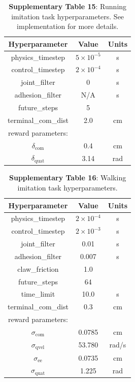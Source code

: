 \documentclass[sn-mathphys-num]{sn-jnl}%
\theoremstyle{thmstyleone}%
\theoremstyle{thmstyletwo}%
\theoremstyle{thmstylethree}%
\begin{document}
\begin{appendices}
\begin{table}[htbp]
	\centering
	\small
	\caption{\textbf{Supplementary Table 15}:
		Running imitation task hyperparameters.
		See implementation for more details.
	}
	\begin{tabular}{ccc}
		\toprule
		\textbf{Hyperparameter}        &        \textbf{Value}  & \textbf{Units}   \\
		\midrule
		physics\_timestep     &  $ 5 \times 10^{-5} $     &  s \\
		control\_timestep     &  $ 2 \times 10^{-4} $     &  s \\
		joint\_filter     &  0     &  s \\
		adhesion\_filter     &  N/A     &  s \\
		future\_steps     &  5     &   \\
		terminal\_com\_dist     &  2.0     &  cm \\
		\midrule
		reward parameters:     &      &   \\
		$ \delta_\text{com} $     &  0.4     &  cm \\
		$ \delta_\text{quat} $     &  3.14     &  rad \\
		\bottomrule
	\end{tabular}%
	\label{tab:s_15}%
\end{table}%


\begin{table}[htbp]
	\centering
	\small
	\caption{\textbf{Supplementary Table 16}:
		Walking imitation task hyperparameters.
	}
	\begin{tabular}{ccc}
		\toprule
		\textbf{Hyperparameter}        &        \textbf{Value}  & \textbf{Units}   \\
		\midrule
		physics\_timestep     &  $ 2 \times 10^{-4} $     &  s \\
		control\_timestep     &  $ 2 \times 10^{-3} $     &  s \\
		joint\_filter     &  0.01     &  s \\
		adhesion\_filter     &  0.007     &  s \\
		claw\_friction     &  1.0     &   \\
		future\_steps     &  64     &   \\
		time\_limit     &  10.0     &  s \\
		terminal\_com\_dist     &  0.3     &  cm \\
		\midrule
		reward parameters:     &      &   \\
		$ \sigma _\text{com} $     &  0.0785     &  cm \\
		$ \sigma _\text{qvel} $     &  53.780     &  rad/s \\
		$ \sigma _\text{ee} $     &  0.0735     &  cm \\
		$ \sigma _\text{quat} $     &  1.225     &  rad \\
		\bottomrule
	\end{tabular}%
	\label{tab:s_16}%
\end{table}%




\end{appendices}
\end{document}
